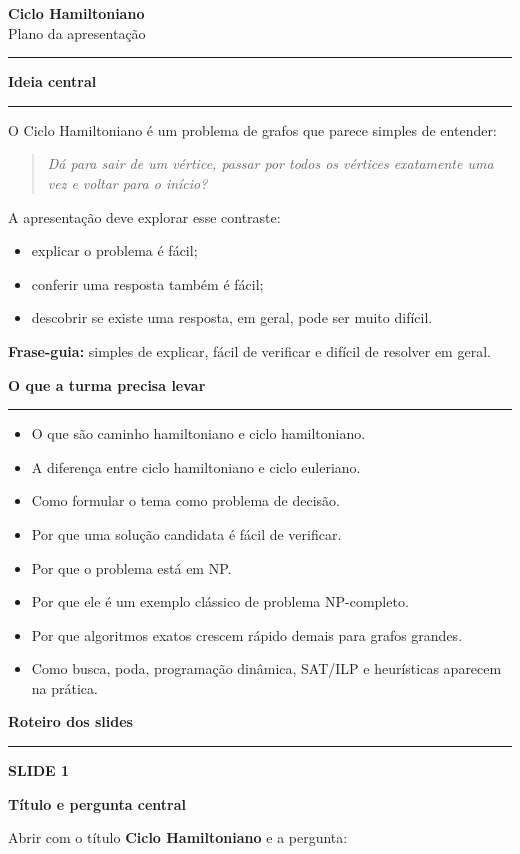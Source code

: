 \documentclass[11pt,a4paper]{article}
\newcommand{\sectiontitle}[1]{%
  \vspace{1.2em}
  {\Large\bfseries\color{accent}#1}\par
  \vspace{-0.35em}
  {\color{linegray}\rule{\linewidth}{0.5pt}}\par
  \vspace{0.25em}
}
\newcommand{\slide}[2]{%
  \vspace{0.9em}
  {\small\bfseries\color{muted}SLIDE #1}\par
  {\large\bfseries #2}\par
  \vspace{-0.3em}
}
\newcommand{\question}[1]{%
  \begin{quote}
    \itshape #1
  \end{quote}
}
\begin{document}
\begin{center}
  {\LARGE\bfseries Ciclo Hamiltoniano}\\[3pt]
  {\large Plano da apresentação}\\[8pt]
  {\color{linegray}\rule{0.78\linewidth}{0.5pt}}
\end{center}

\sectiontitle{Ideia central}

O Ciclo Hamiltoniano é um problema de grafos que parece simples de entender:

\question{Dá para sair de um vértice, passar por todos os vértices exatamente uma vez e voltar para o início?}

A apresentação deve explorar esse contraste:

\begin{itemize}
  \item explicar o problema é fácil;
  \item conferir uma resposta também é fácil;
  \item descobrir se existe uma resposta, em geral, pode ser muito difícil.
\end{itemize}

\textbf{Frase-guia:} simples de explicar, fácil de verificar e difícil de resolver em geral.

\sectiontitle{O que a turma precisa levar}

\begin{itemize}
  \item O que são caminho hamiltoniano e ciclo hamiltoniano.
  \item A diferença entre ciclo hamiltoniano e ciclo euleriano.
  \item Como formular o tema como problema de decisão.
  \item Por que uma solução candidata é fácil de verificar.
  \item Por que o problema está em NP.
  \item Por que ele é um exemplo clássico de problema NP-completo.
  \item Por que algoritmos exatos crescem rápido demais para grafos grandes.
  \item Como busca, poda, programação dinâmica, SAT/ILP e heurísticas aparecem na prática.
\end{itemize}

\sectiontitle{Roteiro dos slides}

\slide{1}{Título e pergunta central}

Abrir com o título \textbf{Ciclo Hamiltoniano} e a pergunta:
\end{document}

